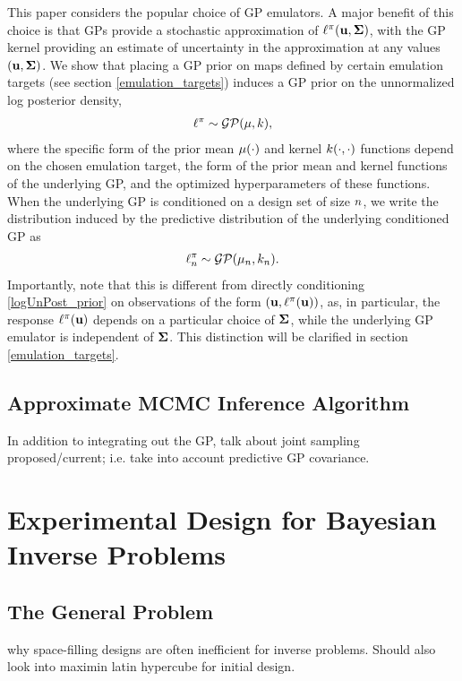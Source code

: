 \documentclass[12pt]{article}
\begin{document}
This paper considers the popular choice of GP emulators. A major benefit of this choice is that GPs provide a stochastic approximation of 
$\ell^{\pi}(\mathbf{u}, \boldsymbol{\Sigma})$, with the GP kernel providing an estimate of uncertainty in the approximation at any values $(\mathbf{u}, \boldsymbol{\Sigma})$. 
We show that placing a GP prior on maps defined by certain emulation targets 
(see section \ref{emulation_targets}) induces a GP prior on the unnormalized log posterior density, 
\begin{align}
\ell^{\pi} \sim \mathcal{GP}(\mu, k), \label{logUnPost_prior}
\end{align}
where the specific form of the prior mean $\mu(\cdot)$ and kernel $k(\cdot, \cdot)$ functions depend on the chosen emulation target, 
the form of the prior mean and kernel functions of the underlying GP, and the optimized hyperparameters of these functions. 
When the underlying GP is conditioned on a design set of size $n$, we write the distribution induced by the predictive distribution 
of the underlying conditioned GP as 
\begin{align}
\ell^{\pi}_{n} \sim \mathcal{GP}(\mu_{n}, k_{n}).
\end{align}
Importantly, note that this is different from directly conditioning \ref{logUnPost_prior} on observations of the form $(\mathbf{u}, \ell^{\pi}(\mathbf{u}))$, as, 
in particular, the response $\ell^{\pi}(\mathbf{u})$ depends on a particular choice of $\boldsymbol{\Sigma}$, while the underlying GP emulator is independent of 
$\boldsymbol{\Sigma}$. This distinction will be clarified in section \ref{emulation_targets}. 

\subsection{Approximate MCMC Inference Algorithm}
In addition to integrating out the GP, talk about joint sampling proposed/current; i.e. take into account predictive GP covariance. 

\section{Experimental Design for Bayesian Inverse Problems}

\subsection{The General Problem}
why space-filling designs are often inefficient for inverse problems. Should also look into maximin latin hypercube for initial design. 
\end{document}
